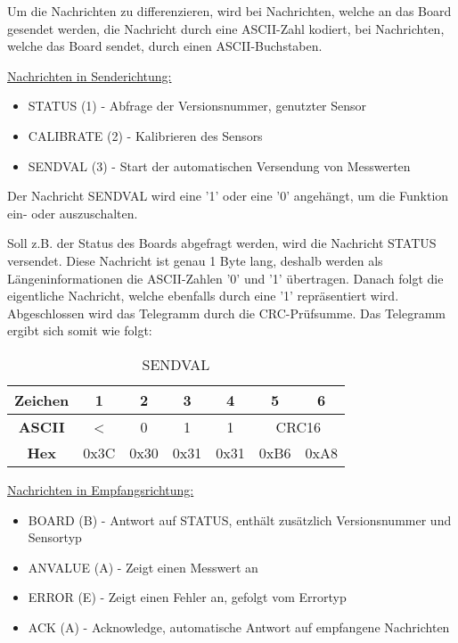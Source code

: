 \smallskip

Um die Nachrichten zu differenzieren, wird bei Nachrichten, welche an das Board gesendet werden, die Nachricht durch eine \acs{ASCII}-Zahl 
kodiert, bei Nachrichten, welche das Board sendet, durch einen \acs{ASCII}-Buchstaben.

\smallskip

\underline{Nachrichten in Senderichtung:}
\begin{itemize}
    \item STATUS (1) - Abfrage der Versionsnummer, genutzter Sensor
    \item CALIBRATE (2) - Kalibrieren des Sensors
    \item SENDVAL (3) - Start der automatischen Versendung von Messwerten 
\end{itemize}

Der Nachricht SENDVAL wird eine '1' oder eine '0' angehängt, um die Funktion ein- oder auszuschalten.

\newpage

Soll z.B. der Status des Boards abgefragt werden, wird die Nachricht STATUS versendet. Diese Nachricht ist genau 1 Byte lang, deshalb
werden als Längeninformationen die \ac{ASCII}-Zahlen '0' und '1' übertragen. Danach folgt die eigentliche Nachricht, welche ebenfalls durch eine '1' 
repräsentiert wird. Abgeschlossen wird das Telegramm durch die CRC-Prüfsumme. Das Telegramm ergibt sich somit wie folgt:

\begin{table}[h]
\centering
\begin{tabular}{| c | c | c | c | c | c | c |}
    \hline
    \textbf{Zeichen} & 1 & 2 & 3 & 4 & 5 & 6 \\
    \hline \hline
    \textbf{ASCII} & < & 0 & 1 & 1 & \multicolumn{2}{|c|}{CRC16} \\
    \hline \hline
    \textbf{Hex} & 0x3C & 0x30 & 0x31 & 0x31 & 0xB6 & 0xA8 \\
    \hline
    
\end{tabular}
\caption{SENDVAL}
\end{table}

\underline{Nachrichten in Empfangsrichtung:}
\begin{itemize}
    \item BOARD (B) - Antwort auf STATUS, enthält zusätzlich Versionsnummer und Sensortyp
    \item ANVALUE (A) - Zeigt einen Messwert an
    \item ERROR (E) - Zeigt einen Fehler an, gefolgt vom Errortyp
    \item ACK (A) - Acknowledge, automatische Antwort auf empfangene Nachrichten
\end{itemize}

